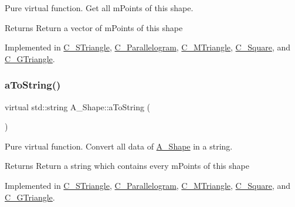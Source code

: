 Pure virtual function. Get all m\+Points of this shape. 

\begin{DoxyReturn}{Returns}
Return a vector of m\+Points of this shape 
\end{DoxyReturn}


Implemented in \hyperlink{classC__STriangle_a431802d5e10b69f535e7929a23963b5e}{C\+\_\+\+S\+Triangle}, \hyperlink{classC__Parallelogram_adfe1c40f2d33955617e3a535c548dfa0}{C\+\_\+\+Parallelogram}, \hyperlink{classC__MTriangle_a5a3971eb0aafc16e5a34bd94130d7c6b}{C\+\_\+\+M\+Triangle}, \hyperlink{classC__Square_a295a170686422b745587a250ebe08a5e}{C\+\_\+\+Square}, and \hyperlink{classC__GTriangle_a18c134ddf90bc4f5729064a47094068b}{C\+\_\+\+G\+Triangle}.

\mbox{\label{classA__Shape_ad8804b4e74543db374af6892367b7c2e}} 
\subsubsection{\texorpdfstring{a\+To\+String()}{aToString()}}
{\footnotesize\ttfamily virtual std\+::string A\+\_\+\+Shape\+::a\+To\+String (\begin{DoxyParamCaption}{ }\end{DoxyParamCaption})\hspace{0.3cm}{\ttfamily [pure virtual]}}



Pure virtual function. Convert all data of \hyperlink{classA__Shape}{A\+\_\+\+Shape} in a string. 

\begin{DoxyReturn}{Returns}
Return a string which contains every m\+Points of this shape 
\end{DoxyReturn}


Implemented in \hyperlink{classC__STriangle_a1ea089f6a82c2770e0529c4a9fc07d90}{C\+\_\+\+S\+Triangle}, \hyperlink{classC__Parallelogram_add67ef2aba5e14c27e30a958e4843223}{C\+\_\+\+Parallelogram}, \hyperlink{classC__MTriangle_a3a769eb21278ec456292d88385b332a2}{C\+\_\+\+M\+Triangle}, \hyperlink{classC__Square_ab2cada51b25cd35b9a79e461767e56f0}{C\+\_\+\+Square}, and \hyperlink{classC__GTriangle_aa432e8b8320db8a53ef1d59b486ed7ce}{C\+\_\+\+G\+Triangle}.

\mbox{\label{classA__Shape_a2c663e21cf31002323b83f9f98234d33}} 
